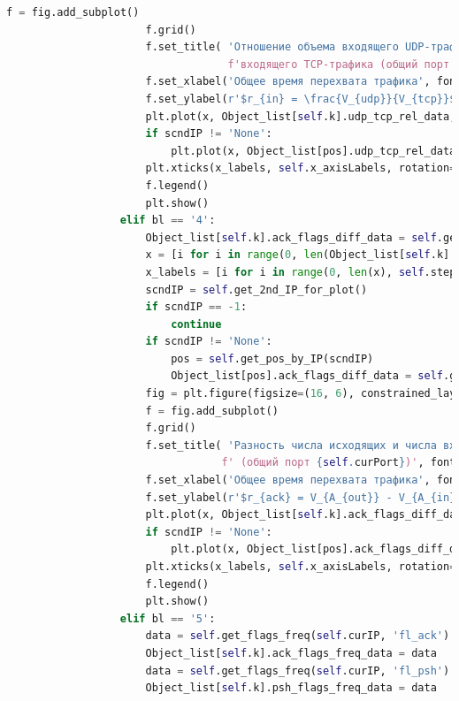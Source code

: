 \documentclass[bachelor, och, coursework]{SCWorks}
\begin{document}
\begin{lstlisting}[language=Python]
                      f = fig.add_subplot()
                      f.grid()
                      f.set_title( 'Отношение объема входящего UDP-трафика к объему ' + 
                                   f'входящего TCP-трафика (общий порт {self.curPort})', fontsize=15 )
                      f.set_xlabel('Общее время перехвата трафика', fontsize=15)
                      f.set_ylabel(r'$r_{in} = \frac{V_{udp}}{V_{tcp}}$', fontsize=15)
                      plt.plot(x, Object_list[self.k].udp_tcp_rel_data, label=self.curIP)
                      if scndIP != 'None':
                          plt.plot(x, Object_list[pos].udp_tcp_rel_data, label=scndIP)
                      plt.xticks(x_labels, self.x_axisLabels, rotation=30, fontsize=10)
                      f.legend()
                      plt.show()
                  elif bl == '4':
                      Object_list[self.k].ack_flags_diff_data = self.get_ack_flags_diff(self.curIP)
                      x = [i for i in range(0, len(Object_list[self.k].ack_flags_diff_data))]
                      x_labels = [i for i in range(0, len(x), self.step)]
                      scndIP = self.get_2nd_IP_for_plot()
                      if scndIP == -1:
                          continue
                      if scndIP != 'None':
                          pos = self.get_pos_by_IP(scndIP)
                          Object_list[pos].ack_flags_diff_data = self.get_ack_flags_diff(scndIP)
                      fig = plt.figure(figsize=(16, 6), constrained_layout=True)
                      f = fig.add_subplot()
                      f.grid()
                      f.set_title( 'Разность числа исходящих и числа входящих ACK-флагов' + \
                                  f' (общий порт {self.curPort})', fontsize=15 )
                      f.set_xlabel('Общее время перехвата трафика', fontsize=15)
                      f.set_ylabel(r'$r_{ack} = V_{A_{out}} - V_{A_{in}}$', fontsize=15)
                      plt.plot(x, Object_list[self.k].ack_flags_diff_data, label=self.curIP)
                      if scndIP != 'None':
                          plt.plot(x, Object_list[pos].ack_flags_diff_data, label=scndIP)
                      plt.xticks(x_labels, self.x_axisLabels, rotation=30, fontsize=10)
                      f.legend()
                      plt.show()
                  elif bl == '5':
                      data = self.get_flags_freq(self.curIP, 'fl_ack')
                      Object_list[self.k].ack_flags_freq_data = data
                      data = self.get_flags_freq(self.curIP, 'fl_psh')
                      Object_list[self.k].psh_flags_freq_data = data

\end{lstlisting}
\end{document}
